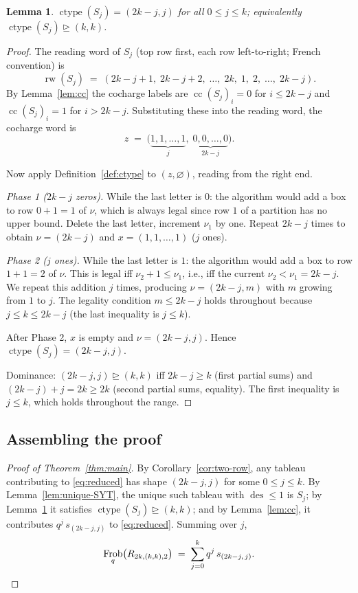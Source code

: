 \documentclass[11pt]{article}
\newtheorem{lemma}[theorem]{Lemma}
\theoremstyle{definition}
\theoremstyle{remark}
\DeclareMathOperator{\Frob}{Frob}
\DeclareMathOperator{\ctype}{ctype}
\DeclareMathOperator{\cc}{cc}
\DeclareMathOperator{\des}{des}
\DeclareMathOperator{\rw}{rw}
\newcommand{\dom}{\trianglerighteq}
\begin{document}
\begin{lemma}\label{lem:ctype}
$\ctype(S_j) = (2k-j, j)$ for all $0 \le j \le k$; equivalently
$\ctype(S_j) \dom (k, k)$.
\end{lemma}

\begin{proof}
The reading word of $S_j$ (top row first, each row left-to-right; French
convention) is
\[
    \rw(S_j) \;=\; (2k-j+1,\; 2k-j+2,\; \ldots,\; 2k,\; 1,\; 2,\; \ldots,\; 2k-j).
\]
By Lemma~\ref{lem:cc} the cocharge labels are $\cc(S_j)_i = 0$ for
$i \le 2k-j$ and $\cc(S_j)_i = 1$ for $i > 2k-j$. Substituting these into the
reading word, the cocharge word is
\[
    z \;=\; \bigl(\underbrace{1, 1, \ldots, 1}_{j},\;
                 \underbrace{0, 0, \ldots, 0}_{2k-j}\bigr).
\]

Now apply Definition~\ref{def:ctype} to $(z, \varnothing)$, reading from the
right end.

\emph{Phase 1 ($2k-j$ zeros).} While the last letter is $0$: the algorithm
would add a box to row $0+1 = 1$ of $\nu$, which is always legal since row $1$
of a partition has no upper bound. Delete the last letter, increment $\nu_1$
by one. Repeat $2k-j$ times to obtain $\nu = (2k-j)$ and $x = (1, 1, \ldots, 1)$
($j$ ones).

\emph{Phase 2 ($j$ ones).} While the last letter is $1$: the algorithm would
add a box to row $1+1 = 2$ of $\nu$. This is legal iff $\nu_2 + 1 \le \nu_1$,
i.e., iff the current $\nu_2 < \nu_1 = 2k - j$. We repeat this addition $j$
times, producing $\nu = (2k-j, m)$ with $m$ growing from $1$ to $j$. The
legality condition $m \le 2k - j$ holds throughout because
$j \le k \le 2k - j$ (the last inequality is $j \le k$).

After Phase 2, $x$ is empty and $\nu = (2k-j, j)$. Hence
$\ctype(S_j) = (2k-j, j)$.

Dominance: $(2k-j, j) \dom (k, k)$ iff $2k - j \ge k$ (first partial sums) and
$(2k-j) + j = 2k \ge 2k$ (second partial sums, equality). The first inequality
is $j \le k$, which holds throughout the range.
\end{proof}

\subsection*{Assembling the proof}

\begin{proof}[Proof of Theorem~\ref{thm:main}]
By Corollary~\ref{cor:two-row}, any tableau contributing to
\eqref{eq:reduced} has shape $(2k-j, j)$ for some $0 \le j \le k$. By
Lemma~\ref{lem:unique-SYT}, the unique such tableau with $\des \le 1$ is
$S_j$; by Lemma~\ref{lem:ctype} it satisfies $\ctype(S_j) \dom (k,k)$; and by
Lemma~\ref{lem:cc}, it contributes $q^j\, s_{(2k-j, j)}$ to
\eqref{eq:reduced}. Summing over $j$,
\[
    \Frob_q\bigl(R_{2k,(k,k),2}\bigr)
    \;=\; \sum_{j=0}^{k} q^{j}\, s_{(2k-j,\,j)}. \qedhere
\]
\end{proof}
\end{document}
